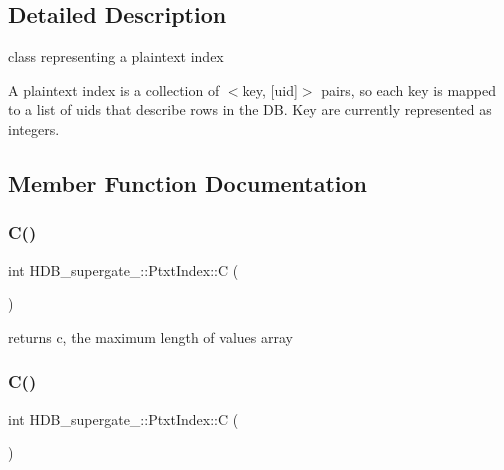 \subsection{Detailed Description}
class representing a plaintext index 

A plaintext index is a collection of $<$key, \mbox{[}uid\mbox{]}$>$ pairs, so each key is mapped to a list of uids that describe rows in the DB. Key are currently represented as integers. 

\subsection{Member Function Documentation}
\mbox{\label{classHDB__supergate___1_1PtxtIndex_afea9f7f34f70aa0a1e0360f7c85e44c7}} 
\subsubsection{\texorpdfstring{C()}{C()}\hspace{0.1cm}{\footnotesize\ttfamily [1/2]}}
{\footnotesize\ttfamily int H\+D\+B\+\_\+supergate\+\_\+\+::\+Ptxt\+Index\+::C (\begin{DoxyParamCaption}{ }\end{DoxyParamCaption})\hspace{0.3cm}{\ttfamily [inline]}}

returns c, the maximum length of values array \mbox{\label{classHDB__supergate___1_1PtxtIndex_afea9f7f34f70aa0a1e0360f7c85e44c7}} 
\subsubsection{\texorpdfstring{C()}{C()}\hspace{0.1cm}{\footnotesize\ttfamily [2/2]}}
{\footnotesize\ttfamily int H\+D\+B\+\_\+supergate\+\_\+\+::\+Ptxt\+Index\+::C (\begin{DoxyParamCaption}{ }\end{DoxyParamCaption})\hspace{0.3cm}{\ttfamily [inline]}}

